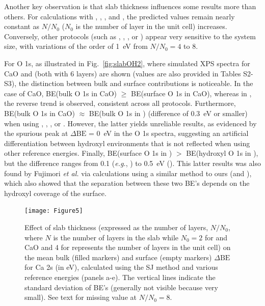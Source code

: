 \documentclass[journal=jpccck,manuscript=article]{achemso}
\def\dbe{\ensuremath{\Delta\text{BE}}}
\begin{document}
Another key observation is that slab thickness influences some results more than others. For calculations with , , , and , the predicted values remain nearly constant as $N/N_0$ ($N_0$ is the number of layer in the unit cell) increases. Conversely, other protocols (such as , , \cpx{\phi}, or ) appear very sensitive to the system size, with variations of the order of \SI{1}{\electronvolt} from $N/N_0=4$ to 8. 

For O 1s, as illustrated in Fig.~\ref{fig:slabOH2}, where simulated XPS spectra for CaO and  (both with 6 layers) are shown  (values are also provided in Tables S2-S3), the distinction between bulk and surface contributions is noticeable. In the case of CaO, BE(bulk O 1s in CaO) $\geq$ BE(surface O 1s in CaO), whereas in , the reverse trend is observed, consistent across all protocols. Furthermore, BE(bulk O 1s in CaO) $\approx$ BE(bulk O 1s in ) (difference of \SI{0.3}{\electronvolt} or smaller) when using , , , or . However, the latter yields unreliable results, as evidenced by the spurious peak at \dbe{} = \SI{0}{\electronvolt} in the O 1s spectra, suggesting an artificial differentiation between hydroxyl environments that is not reflected when using other reference energies. Finally,  BE(surface O 1s in ) $>$ BE(hydroxyl O 1s  in ), but the difference ranges from 0.1 (\textit{e.g.}, ) to \SI{0.5}{\electronvolt} (). This latter results was also found by Fujimori \emph{et al.} \cite{fujimoriInteractionWaterCaO2016a} via calculations using a similar method to ours (and ), which also showed that the separation between these two BE's depends on the hydroxyl coverage of the surface.



\begin{figure}[p]
	\centering
	\texttt{[image: Figure5]}
	\caption{Effect of slab thickness (expressed as the number of layers, $N/N_0$, where $N$ is the number of layers in the slab while $N_0 = 2$ for  and CaO and 4 for  represents the number of layers in the unit cell)  on the mean bulk (filled markers) and surface (empty markers) \dbe{} for Ca 2s (in \si{\electronvolt}), calculated using the SJ method and various reference energies (panels a-e). The vertical lines indicate the standard deviation of BE's  (generally not visible because very small). See text for missing value at $N/N_0=8$.}
	\label{fig:slabsthicknessSJ}
\end{figure}
\end{document}
